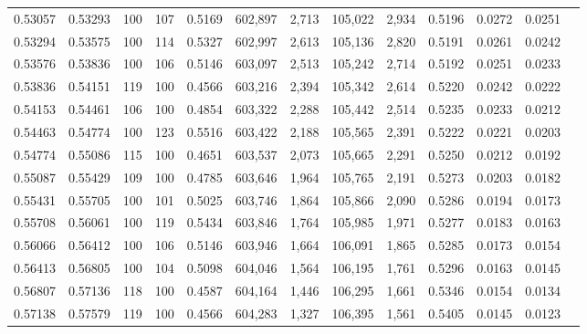 \begin{tabular}{rrrrrrrrrrrrr}
0.53057 & 0.53293 &   100 & 107 &                                     0.5169 & 602,897 &   2,713 & 105,022 &   2,934 & 0.5196 & 0.0272 & 0.0251 \\
0.53294 & 0.53575 &   100 & 114 &                                     0.5327 & 602,997 &   2,613 & 105,136 &   2,820 & 0.5191 & 0.0261 & 0.0242 \\
0.53576 & 0.53836 &   100 & 106 &                                     0.5146 & 603,097 &   2,513 & 105,242 &   2,714 & 0.5192 & 0.0251 & 0.0233 \\
0.53836 & 0.54151 &   119 & 100 &                                     0.4566 & 603,216 &   2,394 & 105,342 &   2,614 & 0.5220 & 0.0242 & 0.0222 \\
0.54153 & 0.54461 &   106 & 100 &                                     0.4854 & 603,322 &   2,288 & 105,442 &   2,514 & 0.5235 & 0.0233 & 0.0212 \\
0.54463 & 0.54774 &   100 & 123 &                                     0.5516 & 603,422 &   2,188 & 105,565 &   2,391 & 0.5222 & 0.0221 & 0.0203 \\
0.54774 & 0.55086 &   115 & 100 &                                     0.4651 & 603,537 &   2,073 & 105,665 &   2,291 & 0.5250 & 0.0212 & 0.0192 \\
0.55087 & 0.55429 &   109 & 100 &                                     0.4785 & 603,646 &   1,964 & 105,765 &   2,191 & 0.5273 & 0.0203 & 0.0182 \\
0.55431 & 0.55705 &   100 & 101 &                                     0.5025 & 603,746 &   1,864 & 105,866 &   2,090 & 0.5286 & 0.0194 & 0.0173 \\
0.55708 & 0.56061 &   100 & 119 &                                     0.5434 & 603,846 &   1,764 & 105,985 &   1,971 & 0.5277 & 0.0183 & 0.0163 \\
0.56066 & 0.56412 &   100 & 106 &                                     0.5146 & 603,946 &   1,664 & 106,091 &   1,865 & 0.5285 & 0.0173 & 0.0154 \\
0.56413 & 0.56805 &   100 & 104 &                                     0.5098 & 604,046 &   1,564 & 106,195 &   1,761 & 0.5296 & 0.0163 & 0.0145 \\
0.56807 & 0.57136 &   118 & 100 &                                     0.4587 & 604,164 &   1,446 & 106,295 &   1,661 & 0.5346 & 0.0154 & 0.0134 \\
0.57138 & 0.57579 &   119 & 100 &                                     0.4566 & 604,283 &   1,327 & 106,395 &   1,561 & 0.5405 & 0.0145 & 0.0123 \\

\end{tabular}
